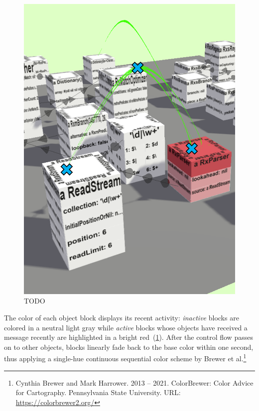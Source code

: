 \begin{figure}
	\includegraphics[height=.25\textheight]{sections/03_visualization_approach/mapping/object_behavior}
	\caption{TODO}
	\label{fig:visualization_approach/mapping/object_behavior}
\end{figure}

The color of each object block displays its recent activity:
\emph{inactive} blocks are colored in a neutral light gray while \emph{active} blocks whose objects have received a message recently are highlighted in a bright red~(\cref{fig:visualization_approach/mapping/object_behavior}).
After the control flow passes on to other objects, blocks linearly fade back to the base color within one second, thus applying a single-hue continuous sequential color scheme by Brewer et al.\footnote{Cynthia Brewer and Mark Harrower. 2013 -- 2021. ColorBrewer: Color Advice for Cartography. Pennsylvania State University. \textsc{URL}: \url{https://colorbrewer2.org/}}

